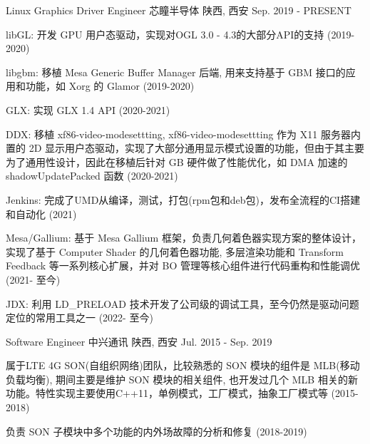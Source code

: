 
\begin{cventries}
  \cventry
    {Linux Graphics Driver Engineer} %
    {芯瞳半导体} %
    {陕西, 西安} %
    {Sep. 2019 - PRESENT} %
    {
      \begin{cvitems} %
        \item {libGL: 开发 GPU 用户态驱动，实现对OGL 3.0 - 4.3的大部分API的支持 (2019-2020)}
        \item {libgbm: 移植 Mesa Generic Buffer Manager 后端, 用来支持基于 GBM 接口的应用和功能，如 Xorg 的 Glamor (2019-2020)}
        \item {GLX: 实现 GLX 1.4 API (2020-2021)}
        \item {DDX: 移植 xf86-video-modesettting, xf86-video-modesettting 作为 X11 服务器内置的 2D 显示用户态驱动，实现了大部分通用显示模式设置的功能，但由于其主要为了通用性设计，因此在移植后针对 GB 硬件做了性能优化，如 DMA 加速的 shadowUpdatePacked 函数 (2020-2021)}
        \item {Jenkins: 完成了UMD从编译，测试，打包(rpm包和deb包)，发布全流程的CI搭建和自动化 (2021)}
        \item {Mesa/Gallium: 基于 Mesa Gallium 框架，负责几何着色器实现方案的整体设计，实现了基于 Computer Shader 的几何着色器功能, 多层渲染功能和 Transform Feedback 等一系列核心扩展，并对 BO 管理等核心组件进行代码重构和性能调优 (2021- 至今)}
        \item {JDX: 利用 LD\_PRELOAD 技术开发了公司级的调试工具，至今仍然是驱动问题定位的常用工具之一 (2022- 至今)}
      \end{cvitems}
    }

  \cventry
    {Software Engineer} %
    {中兴通讯} %
    {陕西, 西安} %
    {Jul. 2015 - Sep. 2019} %
    {
      \begin{cvitems} %
      \item {属于LTE 4G SON(自组织网络)团队，比较熟悉的 SON 模块的组件是 MLB(移动负载均衡), 期间主要是维护 SON 模块的相关组件, 也开发过几个 MLB 相关的新功能。特性实现主要使用C++11，单例模式，工厂模式，抽象工厂模式等 (2015-2018)}
      \item {负责 SON 子模块中多个功能的内外场故障的分析和修复 (2018-2019)}
      \end{cvitems}
    }
\end{cventries}
